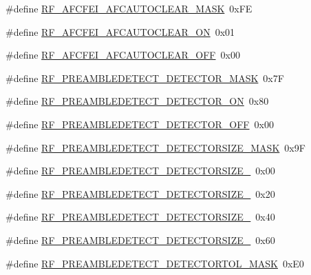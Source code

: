 \begin{DoxyCompactItemize}
\item 
\#define \hyperlink{sx1276Regs-Fsk_8h_a29c1ef8bc89fbd62f2ee2fe4fd84c4c2}{R\+F\+\_\+\+A\+F\+C\+F\+E\+I\+\_\+\+A\+F\+C\+A\+U\+T\+O\+C\+L\+E\+A\+R\+\_\+\+M\+A\+SK}~0x\+FE
\item 
\#define \hyperlink{sx1276Regs-Fsk_8h_a6b142333d65dd99ae62b3b1b4468d192}{R\+F\+\_\+\+A\+F\+C\+F\+E\+I\+\_\+\+A\+F\+C\+A\+U\+T\+O\+C\+L\+E\+A\+R\+\_\+\+ON}~0x01
\item 
\#define \hyperlink{sx1276Regs-Fsk_8h_a49619aa659b86ba6827a8f07aa93ea1e}{R\+F\+\_\+\+A\+F\+C\+F\+E\+I\+\_\+\+A\+F\+C\+A\+U\+T\+O\+C\+L\+E\+A\+R\+\_\+\+O\+FF}~0x00
\item 
\#define \hyperlink{sx1276Regs-Fsk_8h_ad2e43fa3154b37dc7e0425619e018bfa}{R\+F\+\_\+\+P\+R\+E\+A\+M\+B\+L\+E\+D\+E\+T\+E\+C\+T\+\_\+\+D\+E\+T\+E\+C\+T\+O\+R\+\_\+\+M\+A\+SK}~0x7F
\item 
\#define \hyperlink{sx1276Regs-Fsk_8h_ae44badc1d61d3d787bac79bd8ec3855c}{R\+F\+\_\+\+P\+R\+E\+A\+M\+B\+L\+E\+D\+E\+T\+E\+C\+T\+\_\+\+D\+E\+T\+E\+C\+T\+O\+R\+\_\+\+ON}~0x80
\item 
\#define \hyperlink{sx1276Regs-Fsk_8h_a2236d29211449425ac6d2ea24441caa6}{R\+F\+\_\+\+P\+R\+E\+A\+M\+B\+L\+E\+D\+E\+T\+E\+C\+T\+\_\+\+D\+E\+T\+E\+C\+T\+O\+R\+\_\+\+O\+FF}~0x00
\item 
\#define \hyperlink{sx1276Regs-Fsk_8h_ac6926dd5bf77faf266c0755554312b3e}{R\+F\+\_\+\+P\+R\+E\+A\+M\+B\+L\+E\+D\+E\+T\+E\+C\+T\+\_\+\+D\+E\+T\+E\+C\+T\+O\+R\+S\+I\+Z\+E\+\_\+\+M\+A\+SK}~0x9F
\item 
\#define \hyperlink{sx1276Regs-Fsk_8h_a1ffab2e1b21abc6180629831a8cf95bc}{R\+F\+\_\+\+P\+R\+E\+A\+M\+B\+L\+E\+D\+E\+T\+E\+C\+T\+\_\+\+D\+E\+T\+E\+C\+T\+O\+R\+S\+I\+Z\+E\+\_}~0x00
\item 
\#define \hyperlink{sx1276Regs-Fsk_8h_a5301fc89f558a18b6b8770986c726753}{R\+F\+\_\+\+P\+R\+E\+A\+M\+B\+L\+E\+D\+E\+T\+E\+C\+T\+\_\+\+D\+E\+T\+E\+C\+T\+O\+R\+S\+I\+Z\+E\+\_}~0x20
\item 
\#define \hyperlink{sx1276Regs-Fsk_8h_a24df8f8f9be8c45c5d5b5ecc8481c4b6}{R\+F\+\_\+\+P\+R\+E\+A\+M\+B\+L\+E\+D\+E\+T\+E\+C\+T\+\_\+\+D\+E\+T\+E\+C\+T\+O\+R\+S\+I\+Z\+E\+\_}~0x40
\item 
\#define \hyperlink{sx1276Regs-Fsk_8h_a068ff264e935f49fcf3dbc2cea7e0e8a}{R\+F\+\_\+\+P\+R\+E\+A\+M\+B\+L\+E\+D\+E\+T\+E\+C\+T\+\_\+\+D\+E\+T\+E\+C\+T\+O\+R\+S\+I\+Z\+E\+\_}~0x60
\item 
\#define \hyperlink{sx1276Regs-Fsk_8h_afe6902084d6b9beef5eafd33ef3e8909}{R\+F\+\_\+\+P\+R\+E\+A\+M\+B\+L\+E\+D\+E\+T\+E\+C\+T\+\_\+\+D\+E\+T\+E\+C\+T\+O\+R\+T\+O\+L\+\_\+\+M\+A\+SK}~0x\+E0

\end{DoxyCompactItemize}
